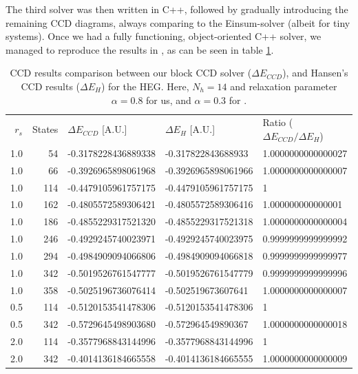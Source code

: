 \documentclass[10pt,twoside]{report}
\begin{document}
	The third solver was then written in C++, followed by gradually introducing the remaining CCD diagrams, always comparing to the Einsum-solver (albeit for tiny systems). Once we had a fully functioning, object-oriented C++ solver, we managed to reproduce the results in \cite{Hansen15}, as can be seen in table \ref{Implementation | table | "CCD benchmarks comparisons"}.
	
	
	\begin{table}[h]
		\centering
		\captionsetup{width=.8\textwidth}
		\caption{CCD results comparison between our block CCD solver ($\Delta E_{CCD}$), and Hansen's CCD results ($\Delta E_{H}$) \cite{Hansen15} for the HEG. Here, $N_h=14$ and relaxation parameter $\alpha=0.8$ for us, and $\alpha=0.3$ for \cite{Hansen15}.}
		\begin{tabular}{rrlll}
			$r_s$ & States & $\Delta E_{CCD}$ [A.U.] & $\Delta E_{H}$ [A.U.] \cite{Hansen15} & Ratio ($\Delta E_{CCD}/\Delta E_{H}$)\\
			1.0 & 54 & -0.3178228436889338 & -0.317822843688933 & 1.0000000000000027 \\
			1.0 & 66 & -0.3926965898061968 & -0.3926965898061966 & 1.0000000000000007\\
			1.0 & 114 & -0.4479105961757175 & -0.4479105961757175 & 1\\
			1.0 & 162 & -0.4805572589306421 & -0.4805572589306416 & 1.000000000000001\\
			1.0 & 186 & -0.4855229317521320 & -0.4855229317521318 & 1.0000000000000004\\
			1.0 & 246 & -0.4929245740023971 & -0.4929245740023975 & 0.9999999999999992\\
			1.0 & 294 & -0.4984909094066806 & -0.4984909094066818 & 0.9999999999999977\\
			1.0 & 342 & -0.5019526761547777 & -0.5019526761547779 & 0.9999999999999996\\
			1.0 & 358 & -0.5025196736076414 & -0.502519673607641 & 1.0000000000000007\\ \hline
			0.5 & 114 & -0.5120153541478306 & -0.5120153541478306 & 1\\
			0.5 & 342 & -0.5729645498903680 & -0.572964549890367 & 1.0000000000000018\\ \hline
			2.0 & 114 & -0.3577968843144996 & -0.3577968843144996 & 1\\
			2.0 & 342 & -0.4014136184665558 & -0.4014136184665555 & 1.0000000000000009\\
		\end{tabular}
		\label{Implementation | table | "CCD benchmarks comparisons"}
	\end{table}
	
\end{document}
